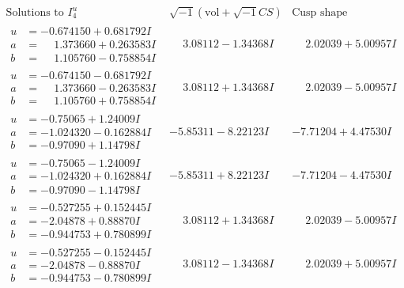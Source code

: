 \documentclass[1p]{elsarticle_modified}
\theoremstyle{definition}
\newcommand{\I}{\sqrt{-1}}
\begin{document}
$$\begin{array}{c|c|c}  
\text{Solutions to }I^u_{4}& \I (\text{vol} + \sqrt{-1}CS) & \text{Cusp shape}\\
 \hline 
\begin{aligned}
u &= -0.674150 + 0.681792 I \\
a &= \phantom{-}1.373660 + 0.263583 I \\
b &= \phantom{-}1.105760 - 0.758854 I\end{aligned}
 & \phantom{-}3.08112 - 1.34368 I & \phantom{-}2.02039 + 5.00957 I \\ \hline\begin{aligned}
u &= -0.674150 - 0.681792 I \\
a &= \phantom{-}1.373660 - 0.263583 I \\
b &= \phantom{-}1.105760 + 0.758854 I\end{aligned}
 & \phantom{-}3.08112 + 1.34368 I & \phantom{-}2.02039 - 5.00957 I \\ \hline\begin{aligned}
u &= -0.75065 + 1.24009 I \\
a &= -1.024320 - 0.162884 I \\
b &= -0.97090 + 1.14798 I\end{aligned}
 & -5.85311 - 8.22123 I & -7.71204 + 4.47530 I \\ \hline\begin{aligned}
u &= -0.75065 - 1.24009 I \\
a &= -1.024320 + 0.162884 I \\
b &= -0.97090 - 1.14798 I\end{aligned}
 & -5.85311 + 8.22123 I & -7.71204 - 4.47530 I \\ \hline\begin{aligned}
u &= -0.527255 + 0.152445 I \\
a &= -2.04878 + 0.88870 I \\
b &= -0.944753 + 0.780899 I\end{aligned}
 & \phantom{-}3.08112 + 1.34368 I & \phantom{-}2.02039 - 5.00957 I \\ \hline\begin{aligned}
u &= -0.527255 - 0.152445 I \\
a &= -2.04878 - 0.88870 I \\
b &= -0.944753 - 0.780899 I\end{aligned}
 & \phantom{-}3.08112 - 1.34368 I & \phantom{-}2.02039 + 5.00957 I \\ \hline\begin{aligned}

\end{aligned}
\end{array}$$
\end{document}

